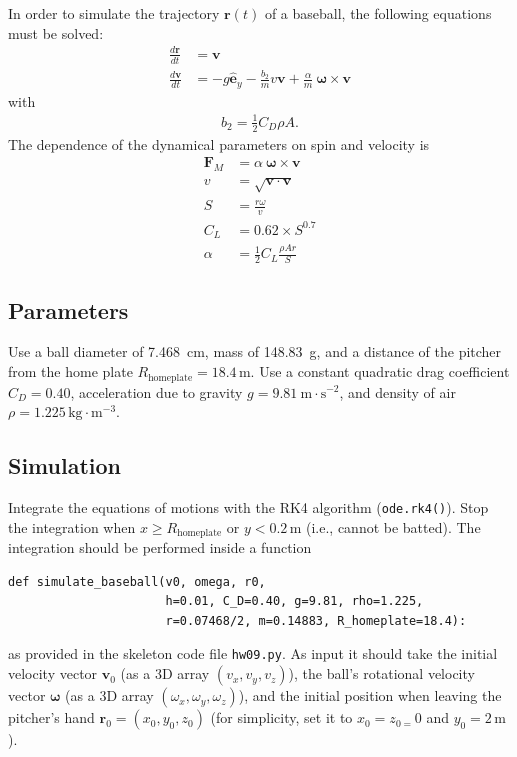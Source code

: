 \documentclass[letterpaper]{scrartcl}
\newcommand{\anumber}{9}
\renewcommand{\vec}[1]{\ensuremath{\mathbf{#1}}}
\begin{document}
In order to simulate the trajectory $\vec{r}(t)$ of a baseball, the
following equations must be solved:
\begin{align}
  \frac{d\vec{r}}{dt} &= \vec{v} \label{eq:drdtv}\\
  \frac{d\vec{v}}{dt} &= -g \hat{\vec{e}}_y  - \frac{b_2}{m} v \vec{v}
          + \frac{\alpha}{m}\ \boldsymbol{\omega} \times \vec{v} \label{eq:dvdta}
\end{align}
with
\begin{gather}
  \label{eq:CD}
  b_{2} = \frac{1}{2} C_{D} \rho A.
\end{gather}
The dependence of the dynamical parameters on spin and velocity is
\begin{align}
  \vec{F}_M &= \alpha\ \boldsymbol{\omega} \times \vec{v}\\
  v &= \sqrt{\vec{v}\cdot\vec{v}} \label{eq:vsquared}\\
  S &= \frac{r\omega}{v}\\
  C_L &= 0.62 \times S^{0.7}\\
  \alpha &= \frac{1}{2} C_L  \frac{\rho A r}{S}
\end{align}

\subsection{Parameters}
\label{sec:parameters}

Use a ball diameter of 7.468~cm, mass of 148.83~g, and a distance of
the pitcher from the home plate $R_\text{homeplate} =
18.4\,\text{m}$.
Use a constant quadratic drag coefficient $C_{D} = 0.40$,
acceleration due to gravity $g = 9.81~\text{m}\cdot\text{s}^{-2}$, and
density of air $\rho = 1.225\,\text{kg}\cdot\text{m}^{-3}$.


\subsection{Simulation}
\label{sec:sim}

Integrate the equations of motions with the RK4 algorithm
(\texttt{ode.rk4()}). Stop the integration when
$x \ge R_\text{homeplate}$ or $y < 0.2\,\text{m}$
(i.e., cannot be batted). The integration should be performed inside a
function
\begin{verbatim}
def simulate_baseball(v0, omega, r0,
                      h=0.01, C_D=0.40, g=9.81, rho=1.225,
                      r=0.07468/2, m=0.14883, R_homeplate=18.4):  
\end{verbatim}
as provided in the skeleton code file \texttt{hw0\anumber.py}. As input it
should take the initial velocity vector $\vec{v}_{0}$ (as a 3D array
$(v_{x}, v_{y}, v_{z})$), the ball's rotational velocity vector
$\boldsymbol{\omega}$ (as a 3D array
$(\omega_{x}, \omega_{y}, \omega_{z})$), and the initial position when
leaving the pitcher's hand $\vec{r}_{0} = (x_{0}, y_{0}, z_{0})$ (for
simplicity, set it to $x_{0}= z_{0 = }0$ and $y_{0}=2\,\text{m}$).
\end{document}
